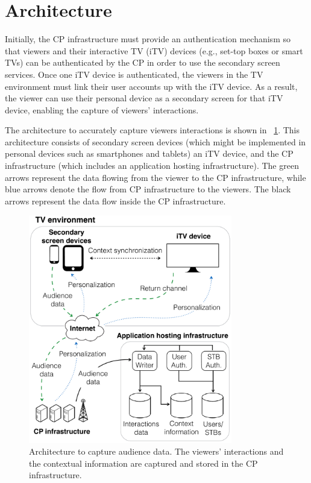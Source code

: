 \documentclass[conference,a4paper]{IEEEtran}
\begin{document}
\section{Architecture}

Initially, the CP infrastructure must provide an authentication mechanism so that viewers and their interactive TV (iTV) devices (e.g., set-top boxes or smart TVs) can be authenticated by the CP in order to use the secondary screen services. Once one iTV device is authenticated, the viewers in the TV environment must link their user accounts up with the iTV device. As a result, the viewer can use their personal device as a secondary screen for that iTV device, enabling the capture of viewers' interactions.

The architecture to accurately capture viewers interactions is shown in \figurename~\ref{fig_architecture}. This architecture consists of secondary screen devices (which might be implemented in personal devices such as smartphones and tablets) an iTV device, and the CP infrastructure (which includes an application hosting infrastructure). The green arrows represent the data flowing from the viewer to the CP infrastructure, while blue arrows denote the flow from CP infrastructure to the viewers. The black arrows represent the data flow inside the CP infrastructure.

\begin{figure}[!t]
	\centering
	\includegraphics[width=3.5in]{img/architecture.pdf}
	\caption{Architecture to capture audience data. The viewers' interactions and the contextual information are captured and stored in the CP infrastructure.}
	\label{fig_architecture}
\end{figure}
\end{document}

